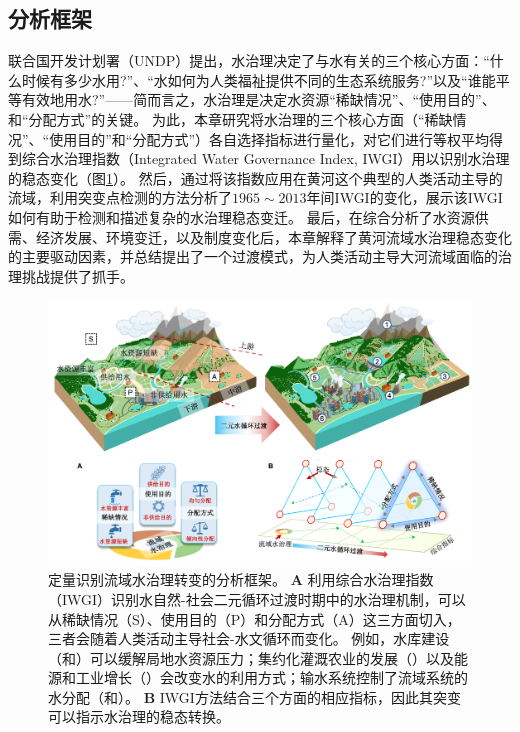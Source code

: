 
\subsection{分析框架}

联合国开发计划署（UNDP）提出\cite{mariajacobson2013}，水治理决定了与水有关的三个核心方面：``什么时候有多少水用?''、``水如何为人类福祉提供不同的生态系统服务?''以及``谁能平等有效地用水?''——简而言之，水治理是决定水资源``稀缺情况''、``使用目的''、和``分配方式''的关键。
为此，本章研究将水治理的三个核心方面（``稀缺情况''、``使用目的''和``分配方式''）各自选择指标进行量化，对它们进行等权平均得到综合水治理指数（Integrated Water Governance Index, IWGI）用以识别水治理的稳态变化（图\ref{ch4:fig:framework}）。
然后，通过将该指数应用在黄河这个典型的人类活动主导的流域，利用突变点检测的方法分析了$1965\sim2013$年间IWGI的变化，展示该IWGI如何有助于检测和描述复杂的水治理稳态变迁。
最后，在综合分析了水资源供需、经济发展、环境变迁，以及制度变化后，本章解释了黄河流域水治理稳态变化的主要驱动因素，并总结提出了一个过渡模式，为人类活动主导大河流域面临的治理挑战提供了抓手。

\begin{figure}[!ht]
\centering
\includegraphics[width=\textwidth]{img/ch4/ch4_framework.png}
\caption[定量识别流域水治理转变的分析框架]{
    定量识别流域水治理转变的分析框架。
    \textbf{A} 利用综合水治理指数（IWGI）识别水自然-社会二元循环过渡时期中的水治理机制，可以从稀缺情况（S）、使用目的（P）和分配方式（A）这三方面切入，三者会随着人类活动主导社会-水文循环而变化。
    例如，水库建设（和）可以缓解局地水资源压力；集约化灌溉农业的发展（）以及能源和工业增长（）会改变水的利用方式；输水系统控制了流域系统的水分配（和）。
    \textbf{B} IWGI方法结合三个方面的相应指标，因此其突变可以指示水治理的稳态转换。}\label{ch4:fig:framework}
\end{figure}

